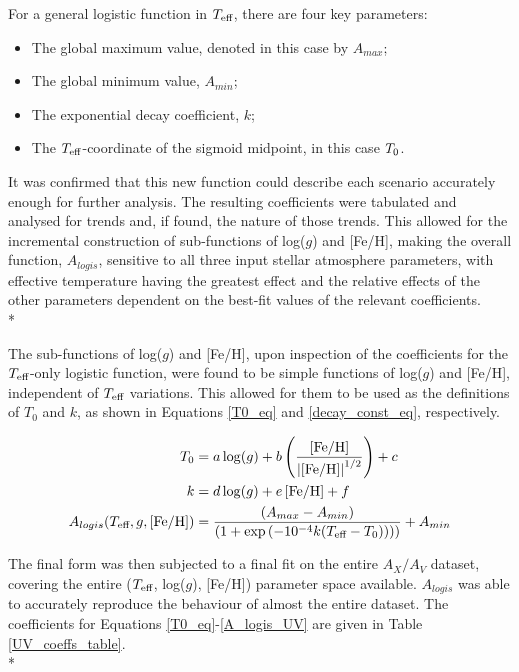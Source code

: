 \documentclass[12pt, a4paper]{report}
\begin{document}
For a general logistic function in $T_{\textnormal{eff}}$, there are four key parameters:
\begin{itemize}
\item The global maximum value, denoted in this case by $A_{max}$;
\item The global minimum value, $A_{min}$;
\item The exponential decay coefficient, $k$;
\item The $T_{\textnormal{eff}}$-coordinate of the sigmoid midpoint, in this case $T_{\textnormal{0}}$.
\end{itemize}

It was confirmed that this new function could describe each scenario accurately enough for further analysis. The resulting coefficients were tabulated and analysed for trends and, if found, the nature of those trends. This allowed for the incremental construction of sub-functions of log($g$) and [Fe/H], making the overall function, $A_{logis}$, sensitive to all three input stellar atmosphere parameters, with effective temperature having the greatest effect and the relative effects of the other parameters dependent on the best-fit values of the relevant coefficients.\\*

The sub-functions of log($g$) and [Fe/H], upon inspection of the coefficients for the $T_{\textnormal{eff}}$-only logistic function, were found to be simple functions of log($g$) and [Fe/H], independent of $T_{\textnormal{eff}}$ variations. This allowed for them to be used as the definitions of $T_{0}$ and $k$, as shown in Equations \ref{T0_eq} and \ref{decay_const_eq}, respectively.

\begin{align}
T_{\textnormal{0}} &= a\log(g) + b\left(\frac{\left[\textnormal{Fe/H}\right]}{\left|\left[\textnormal{Fe/H}\right]\right|^{1/2}}\right) + c \label{T0_eq}\\
k &= d\log(g) + e\left[\textnormal{Fe/H}\right] + f \label{decay_const_eq}\\
A_{logis}(T_{\textnormal{eff}},g,\left[\textnormal{Fe/H}\right]) &= \frac{(A_{max}-A_{min})}{( 1 + \exp{(-10^{-4} k(T_{\textnormal{eff}}-T_{\textnormal{0}})) ) )}} + A_{min} \label{A_logis_UV}
\end{align}

The final form was then subjected to a final fit on the entire $A_{X}/A_{V}$ dataset, covering the entire ($T_{\textnormal{eff}}$,  log($g$), [Fe/H]) parameter space available. $A_{logis}$ was able to accurately reproduce the behaviour of almost the entire dataset. The coefficients for Equations \ref{T0_eq}-\ref{A_logis_UV} are given in Table \ref{UV_coeffs_table}. \\*
\end{document}
